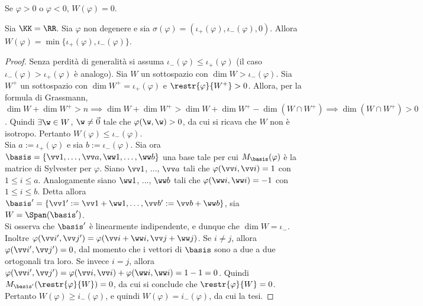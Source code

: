 \documentclass[11pt]{article}
\begin{document}
	\begin{remark}\nl
		\li Se $\varphi > 0$ o $\varphi < 0$, $W(\varphi) = 0$.
	\end{remark}

	\begin{proposition}
		Sia $\KK = \RR$. Sia $\varphi$ non degenere e sia $\sigma(\varphi) = (\iota_+(\varphi), \iota_-(\varphi), 0)$. Allora
		$W(\varphi) = \min\{\iota_+(\varphi), \iota_-(\varphi)\}$.
	\end{proposition}

	\begin{proof}
		Senza perdità di generalità si assuma $\iota_-(\varphi) \leq \iota_+(\varphi)$ (il caso $\iota_-(\varphi) > \iota_+(\varphi)$ è analogo). Sia $W$ un sottospazio con $\dim W > \iota_-(\varphi)$. Sia $W^+$
		un sottospazio con $\dim W^+ = \iota_+(\varphi)$ e $\restr{\varphi}{W^+} > 0$. Allora, per la formula
		di Grassmann, $\dim W + \dim W^+ > n \implies \dim W + \dim W^+ > \dim W + \dim W^+ - \dim (W \cap W^+) \implies \dim (W \cap W^+) > 0$. Quindi $\exists \w \in W$, $\w \neq \vec 0$ tale che $\varphi(\w, \w) > 0$, da cui
		si ricava che $W$ non è isotropo. Pertanto $W(\varphi) \leq \iota_-(\varphi)$. \\
		
		Sia $a := \iota_+(\varphi)$ e sia $b := \iota_-(\varphi)$.
		Sia ora $\basis = \{ \vv 1, \ldots, \vv a, \ww 1, \ldots, \ww b \}$ una base tale per cui $M_\basis(\varphi)$ è  la matrice di Sylvester per $\varphi$. Siano $\vv 1$, ..., $\vv a$ tali che $\varphi(\vv i, \vv i) = 1$
		con $1 \leq i \leq a$. Analogamente siano $\ww 1$, ..., $\ww b$ tali che $\varphi(\ww i, \ww i) = -1$ con
		$1 \leq i \leq b$. Detta allora $\basis' = \{ \vv 1 ' := \vv 1 + \ww 1, \ldots, \vv b ' := \vv b + \ww b \}$, sia $W = \Span(\basis')$. \\
		
		Si osserva che $\basis'$ è linearmente indipendente, e dunque che $\dim W = \iota_-$. Inoltre
		$\varphi(\vv i ', \vv j ') = \varphi(\vv i + \ww i, \vv j + \ww j)$. Se $i \neq j$, allora
		$\varphi(\vv i ', \vv j ') = 0$, dal momento che i vettori di $\basis$ sono a due a due ortogonali
		tra loro. Se invece $i = j$, allora $\varphi(\vv i ', \vv j ') = \varphi(\vv i, \vv i) + \varphi(\ww i, \ww i) = 1-1=0$. Quindi $M_{\basis'}(\restr{\varphi}{W}) = 0$, da cui si conclude che $\restr{\varphi}{W} = 0$.
		Pertanto $W(\varphi) \geq i_-(\varphi)$, e quindi $W(\varphi) = i_-(\varphi)$, da cui la tesi.
	\end{proof}
\end{document}
